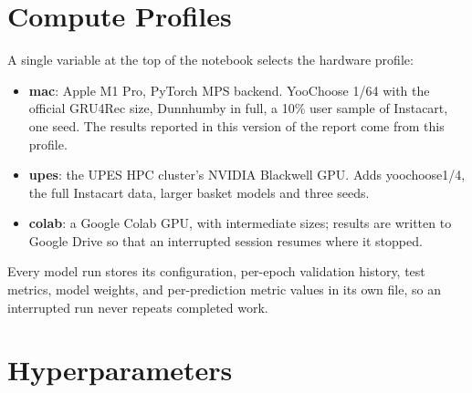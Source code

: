 \section{Compute Profiles}

A single variable at the top of the notebook selects the hardware profile:

\begin{itemize}
    \item \textbf{mac}: Apple M1 Pro, PyTorch MPS backend. YooChoose 1/64 with
          the official GRU4Rec size, Dunnhumby in full, a 10\% user sample of
          Instacart, one seed. The results reported in this version of the report
          come from this profile.
    \item \textbf{upes}: the UPES HPC cluster's NVIDIA Blackwell GPU. Adds
          yoochoose1/4, the full Instacart data, larger basket models and three
          seeds.
    \item \textbf{colab}: a Google Colab GPU, with intermediate sizes; results are
          written to Google Drive so that an interrupted session resumes where it
          stopped.
\end{itemize}

Every model run stores its configuration, per-epoch validation history, test
metrics, model weights, and per-prediction metric values in its own file, so an
interrupted run never repeats completed work.

\section{Hyperparameters}

\begin{table}[H]
\centering
\caption{Hyperparameters (mac profile).}
\label{tab:hyper}
\small
{}
\end{table}

